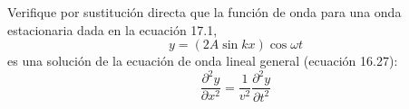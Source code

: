 \item Verifique por sustitución directa que la función de onda para una onda estacionaria dada en la ecuación 17.1,
$$ y = (2A \sin kx) \cos \omega t $$
es una solución de la ecuación de onda lineal general (ecuación 16.27):
$$ \frac{\partial^2 y}{\partial x^2} = \frac{1}{v^2} \frac{\partial^2 y}{\partial t^2} $$